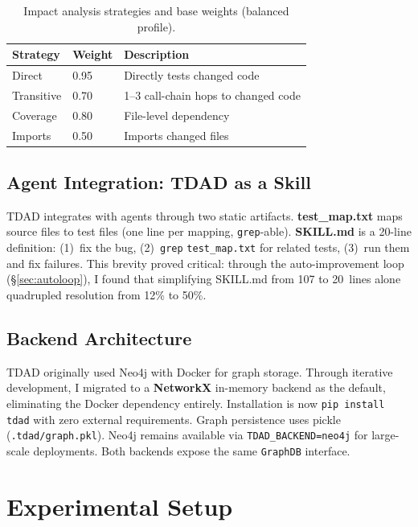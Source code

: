 \documentclass[sigconf,nonacm]{acmart}
\begin{document}
\begin{table}[t]
\caption{Impact analysis strategies and base weights (balanced profile).}
\label{tab:strategies}
\small
\begin{tabular}{@{}llp{4cm}@{}}
\toprule
\textbf{Strategy} & \textbf{Weight} & \textbf{Description} \\
\midrule
Direct     & 0.95 & Directly tests changed code \\
Transitive & 0.70 & 1--3 call-chain hops to changed code \\
Coverage   & 0.80 & File-level dependency \\
Imports    & 0.50 & Imports changed files \\
\bottomrule
\end{tabular}
\end{table}

\subsection{Agent Integration: TDAD as a Skill}

\textsc{TDAD} integrates with agents through two static artifacts.
\textbf{test\_map.txt} maps source files to test files (one line per
mapping, \texttt{grep}-able).  \textbf{SKILL.md} is a 20-line
definition: (1)~fix the bug, (2)~\texttt{grep}
\texttt{test\_map.txt} for related tests, (3)~run them and fix
failures.  This brevity proved critical: through the auto-improvement
loop (\S\ref{sec:autoloop}), I found that simplifying SKILL.md from
107 to 20~lines alone quadrupled resolution from 12\% to 50\%.

\subsection{Backend Architecture}

\textsc{TDAD} originally used Neo4j with Docker for graph storage.
Through iterative development, I migrated to a \textbf{NetworkX}
in-memory backend as the default, eliminating the Docker dependency
entirely.  Installation is now \texttt{pip install tdad} with zero
external requirements.  Graph persistence uses pickle
(\texttt{.tdad/graph.pkl}).  Neo4j remains available via
\texttt{TDAD\_BACKEND=neo4j} for large-scale deployments.  Both
backends expose the same \texttt{GraphDB} interface.


\section{Experimental Setup}
\label{sec:setup}
\end{document}
